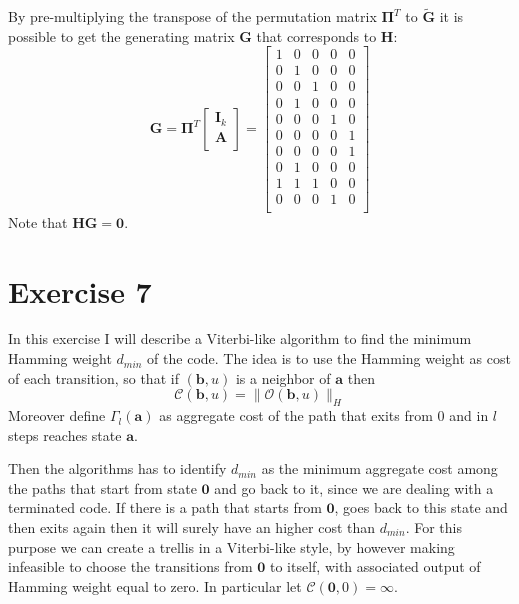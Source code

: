 \documentclass[10pt]{article}
\newcommand{\outf}[1] {\mathcal{O}(#1)}
\begin{document}
By pre-multiplying the transpose of the permutation matrix $\mathbf{\Pi}^T$ to $\mathbf{\tilde{G}}$ it is possible to get the generating matrix $\mathbf{G}$ that corresponds to $\mathbf{H}$:
\begin{equation}
	\mathbf{G} = 
	\mathbf{\Pi}^T
	\begin{bmatrix}
		\mathbf{I}_k \\
		\mathbf{A} \\
	\end{bmatrix} = 
	\begin{bmatrix}
		1&0&0&0&0\\
		0&1&0&0&0\\
		0&0&1&0&0\\
		0&1&0&0&0\\
		0&0&0&1&0\\
		0&0&0&0&1\\
		0&0&0&0&1\\
		0&1&0&0&0\\
		1&1&1&0&0\\
		0&0&0&1&0\\
	\end{bmatrix}
\end{equation}
Note that $\mathbf{H}\mathbf{G} = \mathbf{0}$.


\section*{Exercise 7}
In this exercise I will describe a Viterbi-like algorithm to find the minimum Hamming weight $d_{min}$ of the code. The idea is to use the Hamming weight as cost of each transition, so that if $(\mathbf{b}, u)$ is a neighbor of $\mathbf{a}$ then
\begin{equation}
	\mathcal{C}(\mathbf{b}, u) = \|\outf{\mathbf{b}, u}\|_H
\end{equation}
Moreover define $\Gamma_l(\mathbf{a})$ as aggregate cost of the path that exits from $0$ and in $l$ steps reaches state $\mathbf{a}$.

Then the algorithms has to identify $d_{min}$ as the minimum aggregate cost among the paths that start from state $\mathbf{0}$ and go back to it, since we are dealing with a terminated code. If there is a path that starts from $\mathbf{0}$, goes back to this state and then exits again then it will surely have an higher cost than $d_{min}$. For this purpose we can create a trellis in a Viterbi-like style, by however making infeasible to choose the transitions from $\mathbf{0}$ to itself, with associated output of Hamming weight equal to zero. In particular let $\mathcal{C}(\mathbf{0}, 0) = \infty$.
\end{document}
